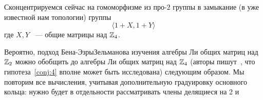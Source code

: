 Сконцентрируемся сейчас на гомоморфизме из про-$2$ группы в замыкание (в уже известной нам топологии) группы
\[\langle 1+X, 1+Y \rangle\]
где $X,Y$ ~--- общие матрицы над $\mathbb{Z}_4$.

Вероятно, подход Бена-Эзры\textemdash Зельманова изучения алгебры Ли общих матриц над $\mathbb{Z}_2$ можно обобщить до алгебры Ли общих матриц над $\mathbb{Z}_{4}$ (авторы пишут~\cite{Ben-Ezra-Zelmanov}, что гипотеза~\ref{conj:4} вполне может быть исследована) следующим образом.
Мы повторим все вычисления, учитывая дополнительную градуировку основного кольца: нужно будет в отдельности рассматривать члены делящиеся на 2 и

